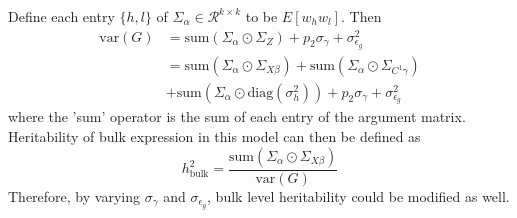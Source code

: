 \documentclass{article}
\begin{document}
Define each entry $\{h,l\}$ of $\Sigma_\alpha \in \mathcal{R}^{k \times k}$ to be $E[w_h w_l]$. Then
\begin{align}
    \text{var}(G) &= 
    \text{sum}(\Sigma_\alpha \odot \Sigma_Z)+p_2\sigma_{\gamma}+\sigma_{\epsilon_g}^2\nonumber \\
    & = \text{sum}(\Sigma_\alpha \odot \Sigma_{X\beta})+\text{sum}(\Sigma_\alpha \odot \Sigma_{C^1\gamma})\nonumber\\
    &+\text{sum}(\Sigma_\alpha\odot\text{diag}(\sigma_h^2))
    +p_2\sigma_{\gamma} +\sigma^2_{\epsilon_g}
\end{align}
where the 'sum' operator is the sum of each entry of the argument matrix. Heritability of bulk expression in this model can then be defined as
\begin{equation}
    h^2_{\text{bulk}} = \frac{\text{sum}(\Sigma_\alpha \odot \Sigma_{X\beta})}{\text{var}(G)}
\end{equation}
Therefore, by varying $\sigma_{\gamma}$ and $\sigma_{\epsilon_g}$, bulk level heritability could be modified as well.
\printbibliography
\end{document}
